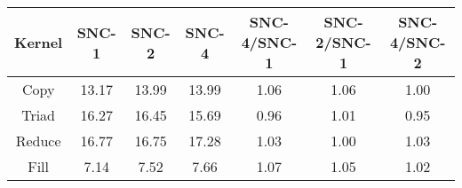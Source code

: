 \begin{tabular}{|c|c|c|c|c|c|c|}  \hline
Kernel&SNC-1&SNC-2&SNC-4 & SNC-4/SNC-1 & SNC-2/SNC-1 & SNC-4/SNC-2 \\ \hline 
Copy & 13.17 & 13.99 & 13.99  & 1.06 & 1.06 & 1.00 \\ \hline 
Triad & 16.27 & 16.45 & 15.69  & 0.96 & 1.01 & 0.95 \\ \hline 
Reduce & 16.77 & 16.75 & 17.28  & 1.03 & 1.00 & 1.03 \\ \hline 
Fill & 7.14 & 7.52 & 7.66  & 1.07 & 1.05 & 1.02 \\ \hline 
\end{tabular}
